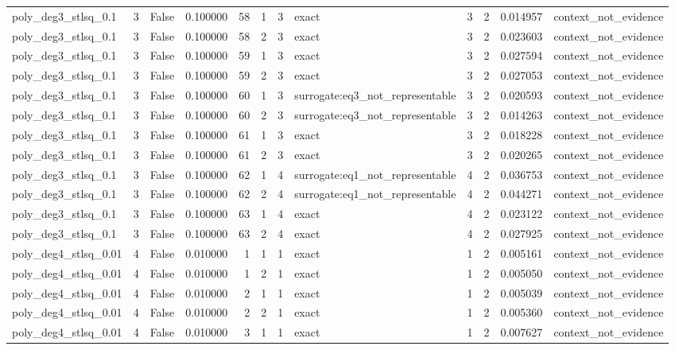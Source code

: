 \begin{tabular}{lrrrrrrlrrrl}
poly\_deg3\_stlsq\_0.1 & 3 & False & 0.100000 & 58 & 1 & 3 & exact & 3 & 2 & 0.014957 & context\_not\_evidence \\
poly\_deg3\_stlsq\_0.1 & 3 & False & 0.100000 & 58 & 2 & 3 & exact & 3 & 2 & 0.023603 & context\_not\_evidence \\
poly\_deg3\_stlsq\_0.1 & 3 & False & 0.100000 & 59 & 1 & 3 & exact & 3 & 2 & 0.027594 & context\_not\_evidence \\
poly\_deg3\_stlsq\_0.1 & 3 & False & 0.100000 & 59 & 2 & 3 & exact & 3 & 2 & 0.027053 & context\_not\_evidence \\
poly\_deg3\_stlsq\_0.1 & 3 & False & 0.100000 & 60 & 1 & 3 & surrogate:eq3\_not\_representable & 3 & 2 & 0.020593 & context\_not\_evidence \\
poly\_deg3\_stlsq\_0.1 & 3 & False & 0.100000 & 60 & 2 & 3 & surrogate:eq3\_not\_representable & 3 & 2 & 0.014263 & context\_not\_evidence \\
poly\_deg3\_stlsq\_0.1 & 3 & False & 0.100000 & 61 & 1 & 3 & exact & 3 & 2 & 0.018228 & context\_not\_evidence \\
poly\_deg3\_stlsq\_0.1 & 3 & False & 0.100000 & 61 & 2 & 3 & exact & 3 & 2 & 0.020265 & context\_not\_evidence \\
poly\_deg3\_stlsq\_0.1 & 3 & False & 0.100000 & 62 & 1 & 4 & surrogate:eq1\_not\_representable & 4 & 2 & 0.036753 & context\_not\_evidence \\
poly\_deg3\_stlsq\_0.1 & 3 & False & 0.100000 & 62 & 2 & 4 & surrogate:eq1\_not\_representable & 4 & 2 & 0.044271 & context\_not\_evidence \\
poly\_deg3\_stlsq\_0.1 & 3 & False & 0.100000 & 63 & 1 & 4 & exact & 4 & 2 & 0.023122 & context\_not\_evidence \\
poly\_deg3\_stlsq\_0.1 & 3 & False & 0.100000 & 63 & 2 & 4 & exact & 4 & 2 & 0.027925 & context\_not\_evidence \\
poly\_deg4\_stlsq\_0.01 & 4 & False & 0.010000 & 1 & 1 & 1 & exact & 1 & 2 & 0.005161 & context\_not\_evidence \\
poly\_deg4\_stlsq\_0.01 & 4 & False & 0.010000 & 1 & 2 & 1 & exact & 1 & 2 & 0.005050 & context\_not\_evidence \\
poly\_deg4\_stlsq\_0.01 & 4 & False & 0.010000 & 2 & 1 & 1 & exact & 1 & 2 & 0.005039 & context\_not\_evidence \\
poly\_deg4\_stlsq\_0.01 & 4 & False & 0.010000 & 2 & 2 & 1 & exact & 1 & 2 & 0.005360 & context\_not\_evidence \\
poly\_deg4\_stlsq\_0.01 & 4 & False & 0.010000 & 3 & 1 & 1 & exact & 1 & 2 & 0.007627 & context\_not\_evidence \\

\end{tabular}
